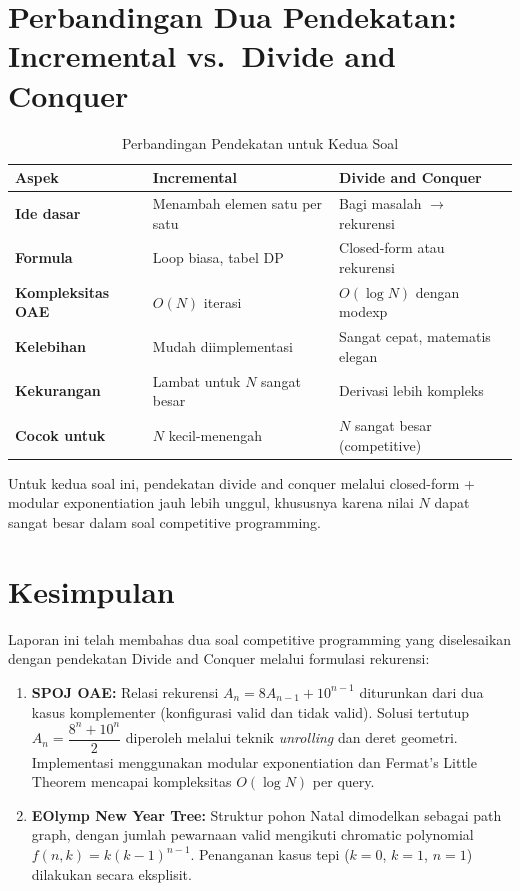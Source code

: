 \documentclass[12pt,a4paper]{article}
\theoremstyle{definition}
\begin{document}
\section{Perbandingan Dua Pendekatan: Incremental vs.\ Divide and Conquer}

\begin{table}[H]
\centering
\caption{Perbandingan Pendekatan untuk Kedua Soal}
\begin{tabular}{>{\bfseries}p{3cm} p{5cm} p{5.5cm}}
\toprule
Aspek & Incremental & Divide and Conquer\\
\midrule
Ide dasar
  & Menambah elemen satu per satu
  & Bagi masalah $\to$ rekurensi\\[4pt]
Formula
  & Loop biasa, tabel DP
  & Closed-form atau rekurensi\\[4pt]
Kompleksitas OAE
  & $O(N)$ iterasi
  & $O(\log N)$ dengan modexp\\[4pt]
Kelebihan
  & Mudah diimplementasi
  & Sangat cepat, matematis elegan\\[4pt]
Kekurangan
  & Lambat untuk $N$ sangat besar
  & Derivasi lebih kompleks\\[4pt]
Cocok untuk
  & $N$ kecil-menengah
  & $N$ sangat besar (competitive)\\
\bottomrule
\end{tabular}
\end{table}

Untuk kedua soal ini, pendekatan divide and conquer melalui closed-form + modular
exponentiation jauh lebih unggul, khususnya karena nilai $N$ dapat sangat besar
dalam soal competitive programming.

\section{Kesimpulan}

Laporan ini telah membahas dua soal competitive programming yang diselesaikan
dengan pendekatan Divide and Conquer melalui formulasi rekurensi:

\begin{enumerate}
  \item \textbf{SPOJ OAE:} Relasi rekurensi $A_n = 8A_{n-1}+10^{n-1}$ diturunkan
        dari dua kasus komplementer (konfigurasi valid dan tidak valid). Solusi
        tertutup $A_n = \dfrac{8^n+10^n}{2}$ diperoleh melalui teknik
        \emph{unrolling} dan deret geometri. Implementasi menggunakan modular
        exponentiation dan Fermat's Little Theorem mencapai kompleksitas
        $O(\log N)$ per query.
  \item \textbf{EOlymp New Year Tree:} Struktur pohon Natal dimodelkan sebagai
        path graph, dengan jumlah pewarnaan valid mengikuti chromatic polynomial
        $f(n,k) = k(k-1)^{n-1}$. Penanganan kasus tepi ($k=0$, $k=1$, $n=1$)
        dilakukan secara eksplisit.
\end{enumerate}
\end{document}
